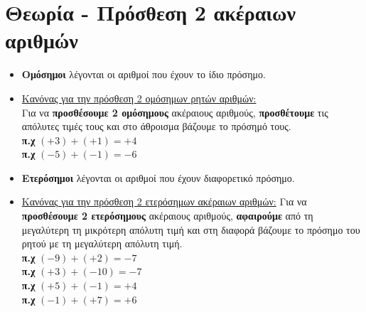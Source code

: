 \documentclass[a4paper,10pt]{report}
\begin{document}
\section*{Θεωρία - Πρόσθεση 2 ακέραιων αριθμών\hfill \small{}}
\begin{itemize}
 \item \textbf{Ομόσημοι} λέγονται οι αριθμοί που έχουν το ίδιο πρόσημο. 
 \item \underline{ Κανόνας για την πρόσθεση 2 ομόσημων ρητών αριθμών:} \\
       Για να \textbf{προσθέσουμε 2 ομόσημους} ακέραιους αριθμούς, 
       \textbf{προσθέτουμε} τις απόλυτες τιμές τους και στο άθροισμα βάζουμε το πρόσημό τους.\\
       \textbf{π.χ} $(+3)+(+1)=+4$\\
       \textbf{π.χ} $(-5)+(-1)=-6$
 \item \textbf{Ετερόσημοι} λέγονται οι αριθμοί που έχουν διαφορετικό πρόσημο. 
 \item \underline{ Κανόνας για την πρόσθεση 2 ετερόσημων ακέραιων αριθμών:} 
        Για να \textbf{προσθέσουμε 2 ετερόσημους} ακέραιους αριθμούς, 
       \textbf{αφαιρούμε} από τη μεγαλύτερη τη μικρότερη απόλυτη τιμή και στη διαφορά βάζουμε το πρόσημο του 
       ρητού με τη μεγαλύτερη απόλυτη τιμή.\\
       \textbf{π.χ} $(-9)+(+2)=-7$\\
       \textbf{π.χ} $(+3)+(-10)=-7$\\
       \textbf{π.χ} $(+5)+(-1)=+4$\\
       \textbf{π.χ} $(-1)+(+7)=+6$
\end{itemize}
\end{document}
